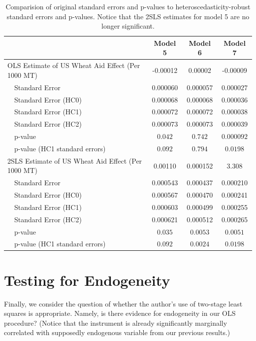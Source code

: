 \documentclass{article}
\begin{document}
\begin{table}
\center 
\begin{tabular}{| l | c | c | c|}
\hline
~ & Model 5 & Model 6 & Model 7 \\
\hline 

OLS Estimate of US Wheat Aid Effect (Per 1000 MT) & -0.00012  & 0.00002 & -0.00009 \\
~~Standard Error & 0.000060 & 0.000057 & 0.000027 \\
~~Standard Error (HC0) & 0.000068 & 0.000068 & 0.000036 \\
~~Standard Error (HC1) & 0.000072 & 0.000072 & 0.000038\\
~~Standard Error (HC2) & 0.000073 & 0.000073 & 0.000039 \\
~~p-value & $ 0.042 $ & $0.742$ 
&$0.000092$\\
~~p-value (HC1 standard errors)& $ 0.092$ & $0.794$ 
&$0.0198$\\
\hline 
2SLS Estimate of US Wheat Aid Effect (Per 1000 MT) & 0.00110 & 0.000152 & 3.308 \\
~~Standard Error & 0.000543 & 0.000437 & 0.000210\\
~~Standard Error (HC0) & 0.000567 & 0.000470 & 0.000241\\
~~Standard Error (HC1) & 0.000603 & 0.000499 & 0.000255\\
~~Standard Error (HC2) & 0.000621 & 0.000512 & 0.000265 \\
~~p-value & $ 0.035 $ & $0.0053$ 
&$0.0051$\\
~~p-value (HC1 standard errors)& $ 0.092$ & $0.0024 $ 
&$0.0198$\\
\hline
\end{tabular}
\label{HCstuff}
\caption{Comparision of original standard errors and p-values to heteroscedasticity-robust standard errors and p-values. Notice that the 2SLS estimates for model 5 are no longer significant. }
\end{table}

\section{Testing for Endogeneity}
Finally, we consider the question of whether the author's use of two-stage least squares is appropriate. Namely, is there evidence for endogeneity in our OLS procedure? (Notice that the instrument is already significantly marginally correlated with supposedly endogenous variable from our previous results.) \\
\end{document}
